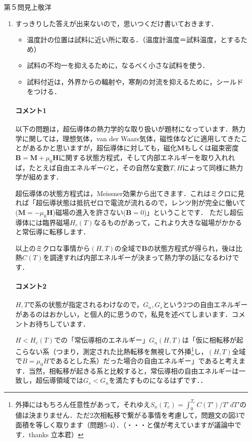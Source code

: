 \newcommand{\pdif}[2]{\frac{\partial {#1}}{\partial {#2}}}
\begin{answer}{第５問}{見上敬洋}
\begin{enumerate}
\item
  すっきりした答えが出来ないので，思いつくだけ書いておきます．
  \begin{itemize}
  \item 温度計の位置は試料に近い所に取る．（温度計温度＝試料温度，とするため）
  \item 試料の不均一を抑えるために，なるべく小さな試料を使う．
  \item 試料付近は，外界からの輻射や，寒剤の対流を抑えるために，シールドをつける．
  \end{itemize}

  \paragraph{コメント1} 
  {\small 以下の問題は，超伝導体の熱力学的な取り扱いが題材になっています．熱力学に関しては，理想気体，van der Waars気体，磁性体などに適用してきたことがあるかと思いますが，超伝導体に対しても，磁化$\bm{M}$もしくは磁束密度$ \bm{B} = \bm{M} + \mu_0\bm{H}$に関する状態方程式，そして内部エネルギーを取り入れれば，たとえば自由エネルギー$G$と，その自然な変数$T,H$によって同様に熱力学が組めます．

  超伝導体の状態方程式は，Meissner効果から出てきます．これはミクロに見れば「超伝導状態は抵抗ゼロで電流が流れるので，レンツ則が完全に働いて($\bm{M} = -\mu_0 \bm{H}$)磁場の進入を許さない($\bm{B} = 0$)」ということです．
  ただし超伝導体には臨界磁場$H_c(T)$なるものがあって，これより大きな磁場がかかると常伝導に転移します．

  以上のミクロな事情から$(H,T)$の全域で$\bm{B}$の状態方程式が得られ，後は比熱$C(T)$を調達すれば内部エネルギーが決まって熱力学の話になるわけです．
  }

  \paragraph{コメント2}
  {\small 
  $H,T$で系の状態が指定されるわけなので，$G_n, G_s$という2つの自由エネルギーがあるのはおかしい，と個人的に思うので，私見を述べてしまいます．コメントお待ちしています．

  $H < H_c(T)$での「常伝導相のエネルギー」$G_n(H,T)$は「仮に相転移が起こらない系（つまり，測定された比熱転移を無視して外挿\footnote{外挿にはもちろん任意性があって，それゆえ$S_{n}(T_c) = \int_0^{T_c}C(T')/T' \, dT'$の値は決まりません．ただ2次相転移で繋がる事情を考慮して，問題文の図3で面積を等しく取ります（問題5-4）．（・・・と僕が考えていますが議論中です．thanks 立本君） }し，$(H,T)$全域で$B = \mu_0 H$であるとした系）だった場合の自由エネルギー」であると考えます．当然，相転移が起きる系と比較すると，常伝導相の自由エネルギーは一致し，超伝導領域では$G_s < G_n$を満たすものになるはずです．．
  }


\end{enumerate}
\end{answer}

